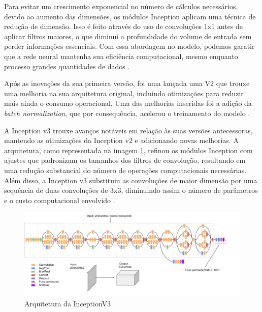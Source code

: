 Para evitar um crescimento exponencial no número de cálculos necessários, devido ao aumento das dimensões, os módulos Inception aplicam uma técnica de redução de dimensão. Isso é feito através do uso de convoluções 1x1 antes de aplicar filtros maiores, o que diminui a profundidade do volume de entrada sem perder informações essenciais. Com essa abordagem no modelo, podemos garatir que a rede neural mantenha sua eficiência computacional, mesmo enquanto processo grandes quantidades de dados \cite{7298594}.

Após as inovações da sua primeira versão, foi uma lançada uma V2 que trouxe uma melhoria na sua arquitetura original, incluindo otimizações para reduzir mais ainda o consumo operacional. Uma das melhorias inseridas foi a adição da \textit{batch normalization}, que por consequência, acelerou o treinamento do modelo \cite{PapersWithCode_InceptionV2}.

 A Inception v3 trouxe avanços notáveis em relação às suas versões antecessoras, mantendo as otimizações da Inception v2 e adicionando novas melhorias. A arquitetura, como representada na imagem \ref{pic:inceptionv3}, refinou os módulos Inception com ajustes que padronizam os tamanhos dos filtros de convolução, resultando em uma redução substancial do número de operações computacionais necessárias. Além disso, a Inception v3 substituiu as convoluções de maior dimensão por uma sequência de duas convoluções de 3x3, diminuindo assim o número de parâmetros e o custo computacional envolvido \cite{Szegedy2016RethinkingTI}.

\begin{figure}[!ht]
    \begin{center}
    \includegraphics[width=350pt]{pictures/inception.png}
    \caption{Arquitetura da InceptionV3}
    \label{pic:inceptionv3}
    \end{center}
\end{figure}


